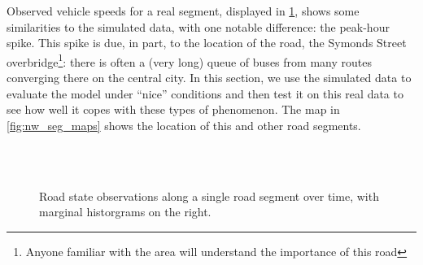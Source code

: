 Observed vehicle speeds for a real segment, displayed in \cref{fig:tt_figure}, shows some similarities to the simulated data, with one notable difference: the peak-hour spike. This spike is due, in part, to the location of the road, the Symonds Street overbridge\footnote{Anyone familiar with the area will understand the importance of this road}: there is often a (very long) queue of buses from many routes converging there on the central city. In this section, we use the simulated data to evaluate the model under ``nice'' conditions and then test it on this real data to see how well it copes with these types of phenomenon. The map in \cref{fig:nw_seg_maps} shows the location of this and other road segments.


\begin{knitrout}\small
{}\color{fgcolor}\begin{figure}

{\centering {}\\
\\

}

\caption[Road state observations along a single road segment over time, with marginal historgrams on the right]{Road state observations along a single road segment over time, with marginal historgrams on the right.}\label{fig:tt_figure}
\end{figure}


\end{knitrout}

